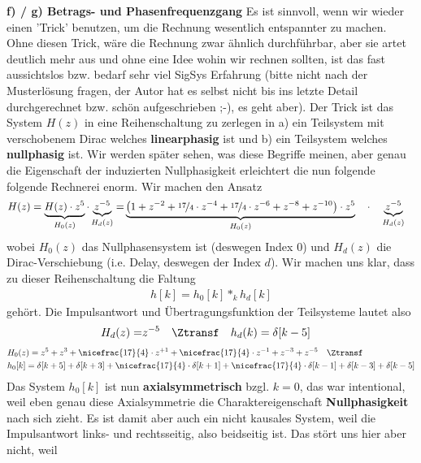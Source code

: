 \textbf{f) / g) Betrags- und Phasenfrequenzgang}
Es ist sinnvoll, wenn wir wieder einen 'Trick' benutzen, um die Rechnung wesentlich
entspannter zu machen. Ohne diesen Trick, wäre die Rechnung zwar ähnlich durchführbar,
aber sie artet deutlich mehr aus und ohne eine Idee wohin wir rechnen sollten,
ist das fast aussichtslos bzw. bedarf sehr viel SigSys Erfahrung (bitte nicht nach
der Musterlösung fragen, der Autor hat es selbst nicht bis ins letzte Detail
durchgerechnet bzw. schön aufgeschrieben ;-), es geht aber).
%
Der Trick ist das System $H(z)$ in eine Reihenschaltung zu zerlegen in a)
ein Teilsystem mit verschobenem Dirac welches \textbf{linearphasig} ist
und b) ein Teilsystem welches \textbf{nullphasig} ist. Wir werden später sehen,
was diese Begriffe meinen, aber genau die Eigenschaft der induzierten
Nullphasigkeit erleichtert die nun folgende folgende Rechnerei enorm.
%
Wir machen den Ansatz
\begin{align}
H(z) = \underbrace{H(z) \cdot z^5}_{H_0(z)} \cdot \underbrace{z^{-5}}_{H_d(z)}= &
\underbrace{\left(1 + z^{-2} + \nicefrac{17}{4}\cdot z^{-4} + \nicefrac{17}{4}\cdot z^{-6} + z^{-8} + z^{-10}\right)
\cdot z^5}_{H_0(z)} \quad \cdot \quad \underbrace{z^{-5}}_{H_d(z)}
\end{align}
wobei $H_0(z)$ das Nullphasensystem ist (deswegen Index $0$) und $H_d(z)$ die
Dirac-Verschiebung (i.e. Delay, deswegen der Index $d$).
Wir machen uns klar, dass zu dieser Reihenschaltung die Faltung
\begin{align}
h[k] = h_0[k] \ast_k h_d[k]
\end{align}
gehört.
%
Die Impulsantwort und Übertragungsfunktion der Teilsysteme lautet also
\begin{align}
H_d(z) =& z^{-5} \quad\Ztransf\quad h_d(k) = \delta[k-5]
\end{align}
\begin{align}
&H_0(z) = z^5 + z^3 + \nicefrac{17}{4}\cdot z^{+1} + \nicefrac{17}{4}\cdot z^{-1} + z^{-3} + z^{-5}
\quad\Ztransf\quad\nonumber\\
&h_0[k] = \delta[k+5] + \delta[k+3] + \nicefrac{17}{4}\cdot\delta[k+1] + \nicefrac{17}{4}\cdot\delta[k-1] + \delta[k-3] + \delta[k-5]
\end{align}
%
Das System $h_0[k]$ ist nun \textbf{axialsymmetrisch} bzgl. $k=0$, das war intentional, weil
eben genau diese Axialsymmetrie die Charaktereigenschaft \textbf{Nullphasigkeit}
nach sich zieht. Es ist damit aber auch ein nicht kausales System, weil die Impulsantwort
links- und rechtsseitig, also beidseitig ist. Das stört uns hier aber nicht, weil

